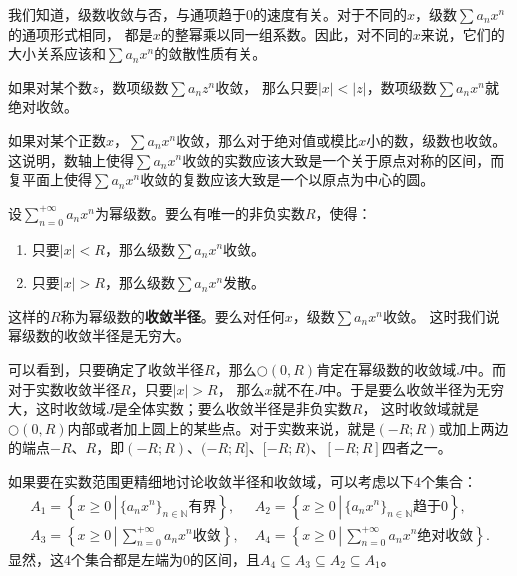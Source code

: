 \documentclass[12pt,UTF8]{ctexbook}
\begin{document}
\begin{appendix}
我们知道，级数收敛与否，与通项趋于$0$的速度有关。对于不同的$x$，级数$\sum a_n x^n$的通项形式相同，
都是$x$的整幂乘以同一组系数。因此，对不同的$x$来说，它们的大小关系应该和$\sum a_n x^n$的敛散性质有关。

\begin{tm}\label{tm:a-1-0}
    如果对某个数$z$，数项级数$\sum a_n z^n$收敛，
    那么只要$|x|<|z|$，数项级数$\sum a_n x^n$就绝对收敛。
\end{tm}

如果对某个正数$x$，$\sum a_n x^n$收敛，那么对于绝对值或模比$x$小的数，级数也收敛。
这说明，数轴上使得$\sum a_n x^n$收敛的实数应该大致是一个关于原点对称的区间，而复平面上使得$\sum a_n x^n$收敛的复数应该大致是一个以原点为中心的圆。

\begin{tm}\label{tm:1-1-10}
    设$\displaystyle\sum_{n=0}^{+\infty} a_n x^n$为幂级数。要么有唯一的非负实数$R$，使得：
    \begin{enumerate}
        \item 只要$|x|<R$，那么级数$\sum a_n x^n$收敛。
        \item 只要$|x|>R$，那么级数$\sum a_n x^n$发散。
    \end{enumerate}
    这样的$R$称为幂级数的\textbf{收敛半径}。要么对任何$x$，级数$\sum a_n x^n$收敛。
    这时我们说幂级数的收敛半径是无穷大。
\end{tm}

可以看到，只要确定了收敛半径$R$，那么$\bigcirc(0,R)$肯定在幂级数的收敛域$J$中。而对于实数收敛半径$R$，只要$|x|>R$，
那么$x$就不在$J$中。于是要么收敛半径为无穷大，这时收敛域$J$是全体实数；要么收敛半径是非负实数$R$，
这时收敛域就是$\bigcirc(0,R)$内部或者加上圆上的某些点。对于实数来说，就是$(-R;R)$或加上两边的端点$-R$、$R$，即$(-R;R)$、$(-R;R]$、$[-R;R)$、$[-R;R]$四者之一。

如果要在实数范围更精细地讨论收敛半径和收敛域，可以考虑以下$4$个集合：
\begin{align*}
    A_1 = \left\{ x \geqslant 0 \, \left| \, \{a_n x^n\}_{n\in\mathbb{N}}\mbox{有界} \right. \right\}, &\; A_2 = \left\{ x \geqslant 0 \, \left| \, \{a_n x^n\}_{n\in\mathbb{N}}\mbox{趋于}0 \right. \right\}, \\[4pt]
    A_3 = \left\{ x \geqslant 0 \, \left| \, \sum_{n=0}^{+\infty} a_n x^n \mbox{收敛} \right. \right\}, &\; A_4 =  \left\{ x \geqslant 0 \, \left| \, \sum_{n=0}^{+\infty} a_n x^n \mbox{绝对收敛} \right. \right\}.
\end{align*}
显然，这$4$个集合都是左端为$0$的区间，且$A_4\subseteq A_3 \subseteq A_2\subseteq A_1$。


\end{appendix}
\end{document}
